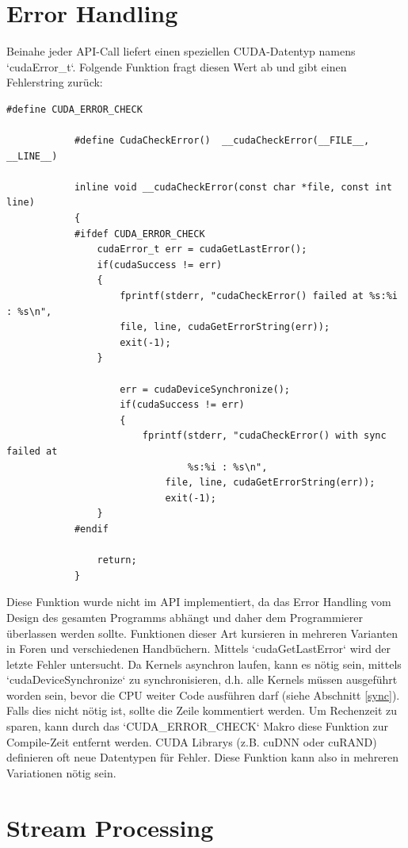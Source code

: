         \newpage				
		\section{Error Handling}
		Beinahe jeder \Gls{API}-Call liefert einen speziellen CUDA-Datentyp namens \li`cudaError_t`. Folgende Funktion fragt diesen Wert ab und gibt einen Fehlerstring zurück:		
		\begin{lstlisting}[caption=Error Handling]
			#define CUDA_ERROR_CHECK

			#define CudaCheckError()  __cudaCheckError(__FILE__, __LINE__)

			inline void __cudaCheckError(const char *file, const int line)
			{
			#ifdef CUDA_ERROR_CHECK
				cudaError_t err = cudaGetLastError();
				if(cudaSuccess != err)
				{
					fprintf(stderr, "cudaCheckError() failed at %s:%i : %s\n",
					file, line, cudaGetErrorString(err));
					exit(-1);
				}

    			    err = cudaDeviceSynchronize();
    			    if(cudaSuccess != err)
    			    {
        			    fprintf(stderr, "cudaCheckError() with sync failed at 
        			        	%s:%i : %s\n",
				        	file, line, cudaGetErrorString(err));
				        	exit(-1);
				}
			#endif

				return;
			}
		\end{lstlisting}
		
		Diese Funktion wurde nicht im \Gls{API} implementiert, da das Error Handling vom Design des gesamten Programms abhängt und daher dem Programmierer überlassen werden sollte. Funktionen dieser Art kursieren in mehreren Varianten in Foren und verschiedenen Handbüchern. Mittels \li`cudaGetLastError` wird der letzte Fehler untersucht. Da \Glspl{Kernel} asynchron laufen, kann es nötig sein, mittels \li`cudaDeviceSynchronize` zu synchronisieren, d.h. alle \Glspl{Kernel} müssen ausgeführt worden sein, bevor die CPU weiter Code ausführen darf (siehe Abschnitt \ref{sync}). Falls dies nicht nötig ist, sollte die Zeile kommentiert werden. Um Rechenzeit zu sparen, kann durch das \li`CUDA_ERROR_CHECK` Makro diese Funktion zur Compile-Zeit entfernt werden. CUDA Librarys (z.B. cuDNN oder cuRAND) definieren oft neue Datentypen für Fehler. Diese Funktion kann also in mehreren Variationen nötig sein.


		\section{Stream Processing}
